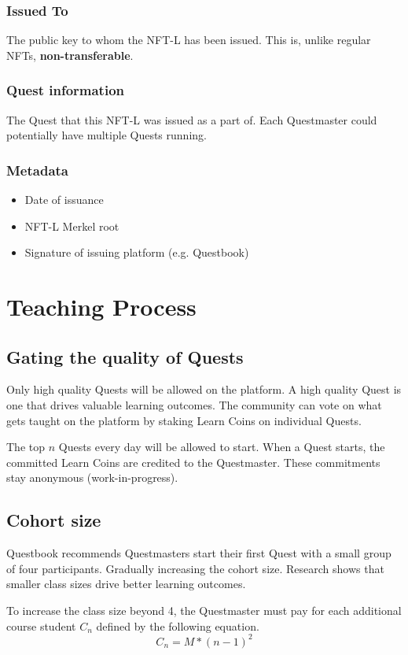 \documentclass{article}
\begin{document}
      \subsubsection{Issued To}
        The public key to whom the NFT-L has been issued. This is, unlike regular NFTs, \textbf{non-transferable}. 
      \subsubsection{Quest information}
        The Quest that this NFT-L was issued as a part of. Each Questmaster could potentially have multiple Quests running. 
      \subsubsection{Metadata}
        \begin{itemize}
          \item Date of issuance
          \item NFT-L Merkel root
          \item Signature of issuing platform (e.g. Questbook)
        \end{itemize}
      
  \section{Teaching Process}
    \subsection{Gating the quality of Quests}
        Only high quality Quests will be allowed on the platform.
        A high quality Quest is one that drives valuable learning outcomes. 
        The community can vote on what gets taught on the platform by staking Learn Coins on individual Quests.
        \par
        The top \(n\) Quests every day will be allowed to start. 
        When a Quest starts, the committed Learn Coins are credited to the Questmaster. These commitments stay anonymous (work-in-progress).
    \subsection{Cohort size}
      Questbook recommends Questmasters start their first Quest with a small group of four participants. Gradually increasing the cohort size. 
      Research shows that smaller class sizes drive better learning outcomes. %
      \par 
      To increase the class size beyond 4, the Questmaster must pay for each additional course student \(C_n\) defined by the following equation.
      \[
        C_n = M * (n-1)^2
      \]
\end{document}
